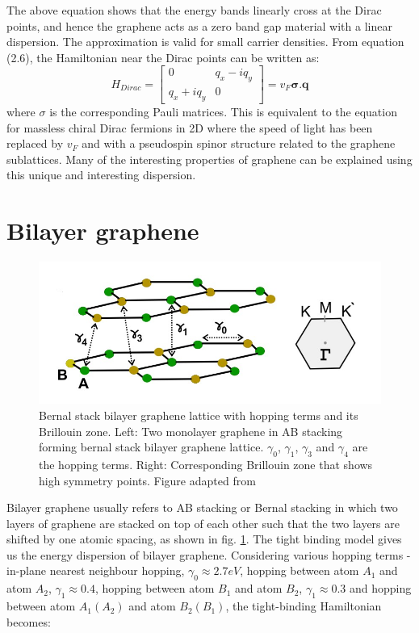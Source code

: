 The above equation shows that the energy bands linearly cross at the Dirac points, and hence the graphene acts as a zero band gap material with a linear dispersion. The approximation is valid for small carrier densities. From equation (2.6), the Hamiltonian near the Dirac points can be written as:
\begin{equation}
	H_{Dirac} =\begin{bmatrix}
		0 & q_x-i q_y \\
		q_x+i q_y & 0 
	\end{bmatrix} = v_F\mathbf{\sigma}.\mathbf{q}
\end{equation}
where $\sigma$ is the corresponding Pauli matrices. This is equivalent to the equation for massless chiral Dirac fermions in 2D where the speed of light has been replaced by $v_F$ and with a pseudospin spinor structure related to the graphene sublattices. Many of the interesting properties of graphene can be explained using this unique and interesting dispersion.

\section{Bilayer graphene}
\begin{figure}[H]
	\centering
	\includegraphics[width=\textwidth]{figures/bilayer_lattice.jpg}
	\caption{Bernal stack bilayer graphene lattice with hopping terms and its Brillouin zone. Left: Two monolayer graphene in AB stacking forming bernal stack bilayer graphene lattice. $\gamma_0$, $\gamma_1$, $\gamma_3$ and $\gamma_4$ are the hopping terms. Right: Corresponding Brillouin zone that shows high symmetry points. Figure adapted from \cite{Geim}}
	\label{fig:bilayer_lattice}
\end{figure}
Bilayer graphene usually refers to AB stacking or Bernal stacking in which two layers of graphene are stacked on top of each other such that the two layers are shifted by one atomic spacing, as shown in fig. \ref{fig:bilayer_lattice}. The tight binding model gives us the energy dispersion of bilayer graphene. Considering various hopping terms - in-plane nearest neighbour hopping, $\gamma_0\approx2.7 eV$, hopping between atom $A_1$ and atom  $A_2$, $\gamma_1\approx0.4$, hopping between atom $B_1$ and atom $B_2$, $\gamma_1\approx0.3$ and hopping between atom $A_1(A_2)$ and atom $B_2(B_1)$, the tight-binding Hamiltonian becomes:

